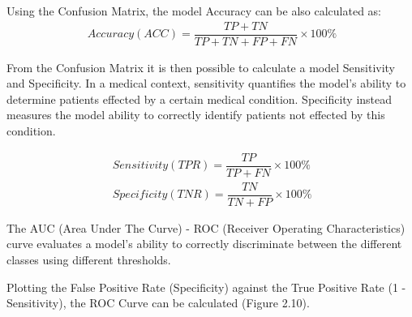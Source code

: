 Using the Confusion Matrix, the model Accuracy can be also calculated as:
\begin{align}
\ Accuracy (ACC) = \dfrac{TP + TN}{TP + TN + FP + FN}\times100\% 
\end{align}

From the Confusion Matrix it is then possible to calculate a model Sensitivity and Specificity. In a medical context, sensitivity quantifies the model's ability to determine patients effected by a certain medical condition. Specificity instead measures the model ability to correctly identify patients not effected by this condition.

\begin{align}
\ Sensitivity (TPR) = \dfrac{TP}{TP + FN}\times100\% \label{eq:1} \\
\ Specificity (TNR)  = \dfrac{TN}{TN + FP}\times100\%
\end{align}

The AUC (Area Under The Curve) - ROC (Receiver Operating Characteristics) curve evaluates a model's ability to correctly discriminate between the different classes using different thresholds. 

Plotting the False Positive Rate (Specificity) against the  True Positive Rate (1 - Sensitivity), the ROC Curve can be calculated (Figure 2.10).